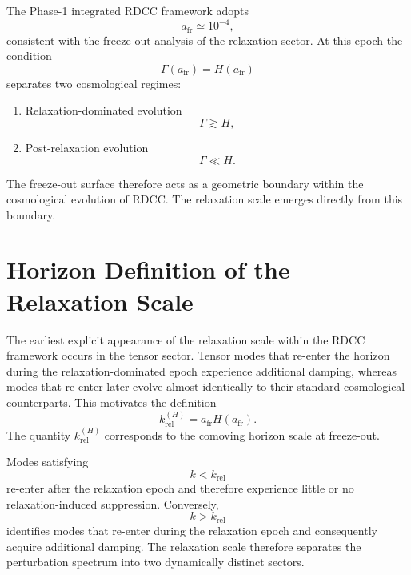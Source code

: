 \documentclass[11pt,a4paper]{article}
\begin{document}
The Phase-1 integrated RDCC framework adopts
\begin{equation}
  a_{\mathrm{fr}} \simeq 10^{-4},
\end{equation}
consistent with the freeze-out analysis of the relaxation sector. At this epoch
the condition
\begin{equation}
  \Gamma(a_{\mathrm{fr}}) = H(a_{\mathrm{fr}})
\end{equation}
separates two cosmological regimes:
\begin{enumerate}[label=\arabic*.]
  \item Relaxation-dominated evolution
  \begin{equation}
    \Gamma \gtrsim H,
  \end{equation}
  \item Post-relaxation evolution
  \begin{equation}
    \Gamma \ll H.
  \end{equation}
\end{enumerate}
The freeze-out surface therefore acts as a geometric boundary within the
cosmological evolution of RDCC. The relaxation scale emerges directly from this
boundary.

\section{Horizon Definition of the Relaxation Scale}

The earliest explicit appearance of the relaxation scale within the RDCC
framework occurs in the tensor sector. Tensor modes that re-enter the horizon
during the relaxation-dominated epoch experience additional damping, whereas
modes that re-enter later evolve almost identically to their standard
cosmological counterparts. This motivates the definition
\begin{equation}
  k_{\mathrm{rel}}^{(H)}
  =
  a_{\mathrm{fr}} H(a_{\mathrm{fr}}).
  \label{eq:krelH}
\end{equation}
The quantity \(k_{\mathrm{rel}}^{(H)}\) corresponds to the comoving horizon
scale at freeze-out.

Modes satisfying
\begin{equation}
  k < k_{\mathrm{rel}}
\end{equation}
re-enter after the relaxation epoch and therefore experience little or no
relaxation-induced suppression. Conversely,
\begin{equation}
  k > k_{\mathrm{rel}}
\end{equation}
identifies modes that re-enter during the relaxation epoch and consequently
acquire additional damping. The relaxation scale therefore separates the
perturbation spectrum into two dynamically distinct sectors.
\end{document}
